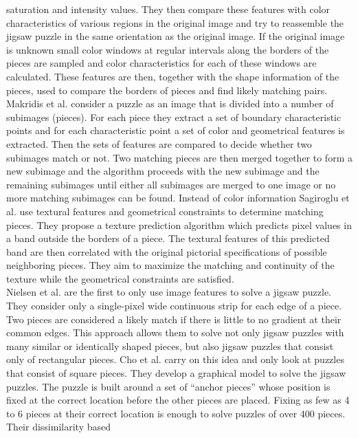 \documentclass[11pt]{report}
\begin{document}
saturation and intensity values. They then compare these features with color
characteristics of various regions in the original image and try to reassemble
the jigsaw puzzle in the same orientation as the original image. If the
original image is unknown small color windows at regular intervals along the
borders of the pieces are sampled and color characteristics for each of these
windows are calculated. These features are then, together with the shape
information of the pieces, used to compare the borders of pieces and find likely
matching pairs. Makridis et al. \cite{makridis2006new} consider a puzzle as an
image that is divided into a number of subimages (pieces). For each piece they
extract a set of boundary characteristic points and for each characteristic
point a set of color and geometrical features is extracted. Then the sets of
features are compared to decide whether two subimages match or not. Two matching
pieces are then merged together to form a new subimage and the algorithm
proceeds with the new subimage and the remaining subimages until either all
subimages are merged to one image or no more matching subimages can be found.
Instead of color information Sagiroglu et al. \cite{sagiroglu2006texture} use
textural features and geometrical constraints to determine matching pieces. They
propose a texture prediction algorithm which predicts pixel values in a band
outside the borders of a piece. The textural features of this predicted band are
then correlated with the original pictorial specifications of possible
neighboring pieces. They aim to maximize the matching and continuity of the
texture while the geometrical constraints are satisfied. \\
Nielsen et al. \cite{nielsen2008solving} are the first to only use image
features to solve a jigsaw puzzle. They consider only a single-pixel wide
continuous strip for each edge of a piece. Two pieces are considered a likely
match if there is little to no gradient at their common edges. This approach
allows them to solve not only jigsaw puzzles with many similar or identically shaped
pieces, but also jigsaw puzzles that consist only of rectangular pieces. Cho et
al. \cite{Cho2010} carry on this idea and only look at puzzles that consist of
square pieces. They develop a graphical model to solve the jigsaw puzzles. The
puzzle is built around a set of ``anchor pieces'' whose position is fixed at the
correct location before the other pieces are placed. Fixing
as few as 4 to 6 pieces at their correct location is enough to solve puzzles of
over 400 pieces. Their dissimilarity based
\end{document}

